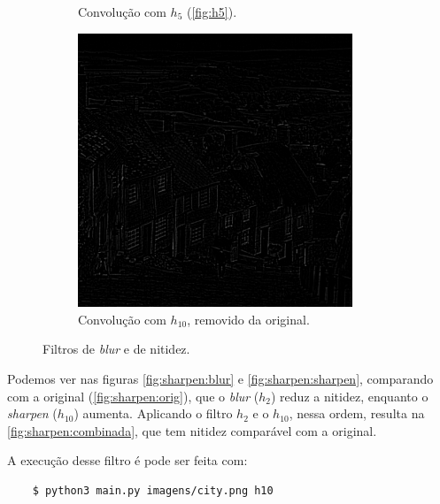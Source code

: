 \begin{figure}[H]
\begin{subfigure}{0.48\textwidth}
        \caption{Convolução com $h_5$ (\ref{fig:h5}).}
        \label{fig:sharpen:edge}
    \end{subfigure}%
    \begin{subfigure}{0.48\textwidth}
        \centering
        \includegraphics[width=0.9\textwidth]{resultados/city_h10e.png}
        \caption{Convolução com $h_{10}$, removido da original.}
        \label{fig:sharpen:sub}
    \end{subfigure}

    \caption{Filtros de \textit{blur} e de nitidez.}
\end{figure}

Podemos ver nas figuras \ref{fig:sharpen:blur} e \ref{fig:sharpen:sharpen}, comparando com a original (\ref{fig:sharpen:orig}), que o \textit{blur} ($h_2$) reduz a nitidez, enquanto o \textit{sharpen} ($h_{10}$) aumenta. Aplicando o filtro $h_2$ e o $h_{10}$, nessa ordem, resulta na \cref{fig:sharpen:combinada}, que tem nitidez comparável com a original.

A execução desse filtro é pode ser feita com:

\begin{verbatim}
    $ python3 main.py imagens/city.png h10
\end{verbatim}
